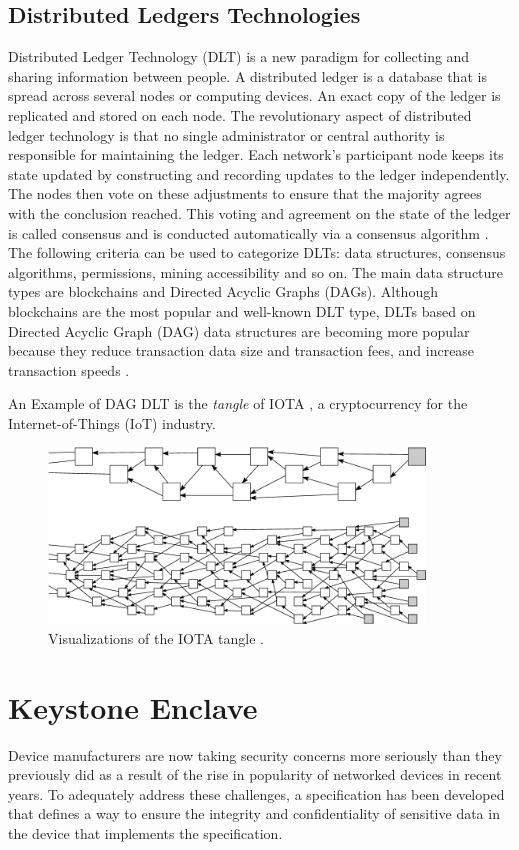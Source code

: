 \subsection{Distributed Ledgers Technologies}

Distributed Ledger Technology (DLT)  is a new paradigm for collecting and sharing information between people. A distributed ledger is a database that is spread across several nodes or computing devices. An exact copy of the ledger is replicated and stored on each node. The revolutionary aspect of distributed ledger technology is that no single administrator or central authority is responsible for maintaining the ledger. Each network's participant node keeps its state updated by constructing and recording updates to the ledger independently. The nodes then vote on these adjustments to ensure that the majority agrees with the conclusion reached. This voting and agreement on the state of the ledger is called consensus and is conducted automatically via a consensus algorithm \cite{dlt-intro-1}. 
The following criteria can be used to categorize DLTs: data structures, consensus algorithms, permissions, mining accessibility and so on. The main data structure types are blockchains and Directed Acyclic Graphs (DAGs). Although blockchains are the most popular and well-known DLT type,  DLTs based on Directed Acyclic Graph (DAG) data structures are becoming more popular because they reduce transaction data size and transaction fees, and increase transaction speeds \cite{dlt-intro-2}.

An Example of DAG DLT is the \textit{tangle} of IOTA \cite{popov2018tangle}, a cryptocurrency for the Internet-of-Things (IoT) industry.

\begin{figure}[h!]
    \centering
    \includegraphics[width=10cm]{./chapters/images/tangle.png}
    \caption{Visualizations of the IOTA tangle \cite{popov2018tangle}.}
    \label{tangleFigure}
\end{figure}


\section{Keystone Enclave}
Device manufacturers are now taking security concerns more seriously than they previously did as a result of the rise in popularity of networked devices in recent years.
To adequately address these challenges, a specification has been developed that defines a way to ensure the integrity and confidentiality of sensitive data in the device that implements the specification.
\cite{IntroTEE}
